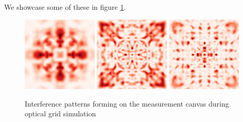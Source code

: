We showcase some of these in figure \ref{fig:optical_grid_interference}.
\begin{figure}
	\begin{center}
		\includegraphics[width=0.32\textwidth]{figures/optical_grid_interference_01.png}
		\includegraphics[width=0.32\textwidth]{figures/optical_grid_interference_02.png}
		\includegraphics[width=0.32\textwidth]{figures/optical_grid_interference_03.png}
		\caption{Interference patterns forming on the measurement canvas during optical grid simulation}
		\label{fig:optical_grid_interference}
	\end{center}	
\end{figure}

